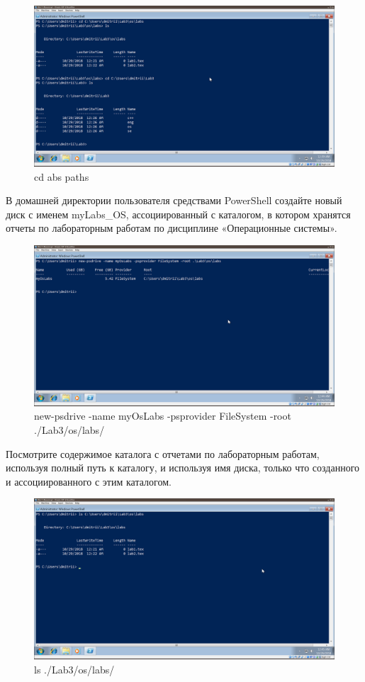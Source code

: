 \documentclass[a4paper]{article}
\begin{document}
\begin{figure}[H]
    \centering
    \includegraphics[width=\linewidth]{12.png}
    \caption{cd abs paths}
\end{figure}

В домашней директории пользователя средствами PowerShell создайте новый диск с именем myLabs\_OS, ассоциированный с каталогом, в котором хранятся отчеты по лабораторным работам по дисциплине «Операционные системы».

\begin{figure}[H]
    \centering
    \includegraphics[width=\linewidth]{13.png}
    \caption{new-psdrive -name myOsLabs -psprovider FileSystem -root ./Lab3/os/labs/}
\end{figure}

Посмотрите содержимое каталога с отчетами по лабораторным работам, используя полный путь к каталогу, и используя имя диска, только что созданного и ассоциированного с этим каталогом.

\begin{figure}[H]
    \centering
    \includegraphics[width=\linewidth]{14.png}
    \caption{ls ./Lab3/os/labs/}
\end{figure}
\end{document}
